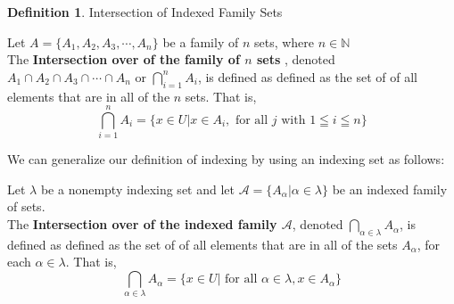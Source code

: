 \documentclass{book}
\theoremstyle{definition}
\newtheorem{definition}{Definition}[section]
\theoremstyle{remark}
\newcommand{\bb}[1]{\mathbb{#1}}
\begin{document}
\begin{definition}
Intersection of Indexed Family Sets \footnotemark \\
 
    \begin{tcolorbox}
    Let $A = \{A_1, A_2, A_3, \cdots, A_n  \}$ be a family of $n$ sets, where $n \in \bb{N}$ \\ 
    
    The \textbf{Intersection over of the family of $n$ sets} , denoted $A_1 \cap A_2 \cap A_3 \cap \cdots \cap A_n$ or $\bigcap_{i=1}^{n}{A_i}$, is defined as defined as the set of of all elements that are in all of the $n$ sets. That is,  
        \begin{equation*}
            \bigcap_{i=1}^{n}{A_i} = \{x \in U | x \in A_i, \text{ for all } j \text{ with } 1 \leqq i \leqq n \}
        \end{equation*}
    \end{tcolorbox}
    
We can generalize our definition of indexing by using an indexing set \footnotemark as follows:


    \begin{tcolorbox}
    Let $\lambda$ be a nonempty indexing set and let $\mathcal{A} = \{ A_{\alpha} | \alpha \in \lambda \}$ be an indexed family of sets. \\ 
    The \textbf{Intersection over of the indexed family $\mathcal{A}$}, denoted $\bigcap_{\alpha \in \lambda}{A_{\alpha}}$, is defined as defined as the set of of all elements that are in all of the sets $A_{\alpha}$, for each $\alpha \in \lambda$. That is,  
        \begin{equation*}
            \bigcap_{\alpha \in \lambda}{A_{\alpha}} = \{x \in U | \text{ for all } \alpha \in \lambda, x \in A_{\alpha} \}
        \end{equation*}
    \end{tcolorbox}
\end{definition}
\end{document}

